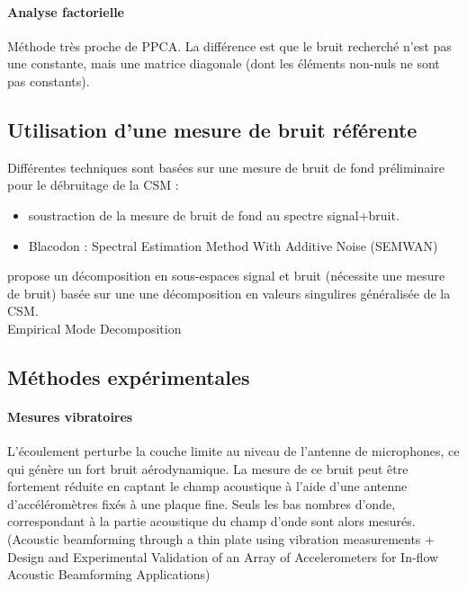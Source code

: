 \paragraph{\tbullet Analyse factorielle}
Méthode très proche de PPCA. La différence est que le bruit recherché n'est pas une constante, mais une matrice diagonale (dont les éléments non-nuls ne sont pas constants).



\subsection{Utilisation d'une mesure de bruit référente}
Différentes techniques sont basées sur une mesure de bruit de fond préliminaire pour le débruitage de la CSM : 
\begin{itemize}
	\item soustraction de la mesure de bruit de fond au spectre signal+bruit.
	\item Blacodon : Spectral Estimation Method With Additive Noise (SEMWAN)
\end{itemize}

\cite{Bulte2007} propose un décomposition en sous-espaces signal et bruit (nécessite une mesure de bruit) basée sur une une décomposition en valeurs singulires généralisée de la CSM.\\
Empirical Mode Decomposition\\









\subsection{Méthodes expérimentales}

\paragraph{\tbullet Mesures vibratoires} L'écoulement perturbe la couche limite au niveau de l'antenne de microphones, ce qui génère un fort bruit aérodynamique. La mesure de ce bruit peut être fortement réduite en captant le champ acoustique à l'aide d'une antenne d'accéléromètres fixés à une plaque fine. Seuls les bas nombres d'onde, correspondant à la partie acoustique du champ d'onde sont alors mesurés. (Acoustic beamforming through a thin plate using vibration measurements  +   Design and Experimental Validation of an Array of Accelerometers for In-flow Acoustic Beamforming Applications) \\

